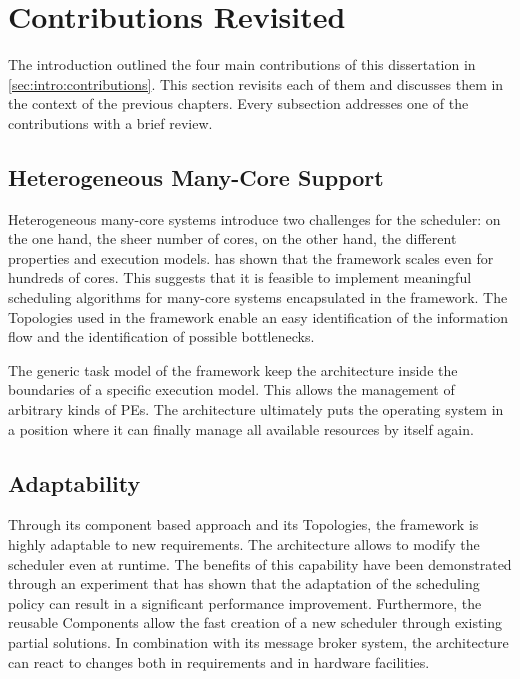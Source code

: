 \section{Contributions Revisited}%
\label{sec:concl:claims}

The introduction outlined the four main contributions of this dissertation in \cref{sec:intro:contributions}. This section revisits each of them and discusses them in the context of the previous chapters. Every subsection addresses one of the contributions with a brief review.

\subsection{Heterogeneous Many-Core Support}

Heterogeneous many-core systems introduce two challenges for the scheduler: on the one hand, the sheer number of cores, on the other hand, the different properties and execution models.  has shown that the \cobas{} framework scales even for hundreds of cores. This suggests that it is feasible to implement meaningful scheduling algorithms for many-core systems encapsulated in the \cobas{} framework. The Topologies used in the framework enable an easy identification of the information flow and the identification of possible bottlenecks.

The generic task model of the framework keep the architecture inside the boundaries of a specific execution model. This allows the management of arbitrary kinds of \acp{PE}. The \cobas{} architecture ultimately puts the operating system in a position where it can finally manage all available resources by itself again.

\subsection{Adaptability}

Through its component based approach and its Topologies, the \cobas{} framework is highly adaptable to new requirements. The architecture allows to modify the scheduler even at runtime. The benefits of this capability have been demonstrated through an experiment that has shown that the adaptation of the scheduling policy can result in a significant performance improvement. Furthermore, the reusable Components allow the fast creation of a new scheduler through existing partial solutions. In combination with its message broker system, the \cobas{} architecture can react to changes both in requirements and in hardware facilities.

